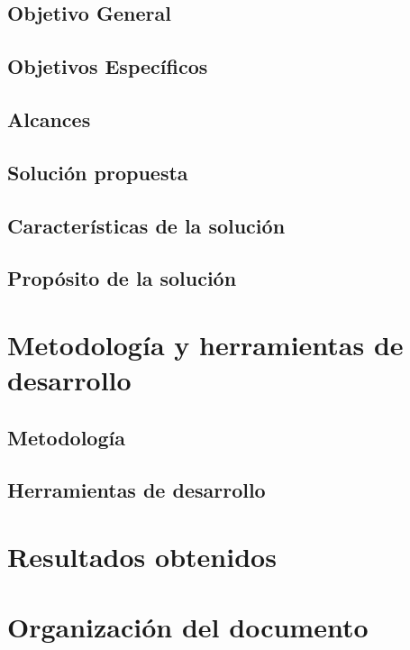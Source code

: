 




\subsection{Objetivo General}
\label{intro:objetivogeneral}


\subsection{Objetivos Espec\'ificos}
\label{intro:objetivosespecificos}





\subsection{Alcances}
\label{intro:alcances}


\subsection{Soluci\'on propuesta}
\label{intro:solucionpropuesta}

\subsection{Caracter\'isticas de la solución}
\label{intro:caracteristicassolucion}



\subsection{Prop\'osito de la solución}
\label{intro:propositosolucion}


\section{Metodolog\'ia y herramientas de desarrollo}
\subsection{Metodolog\'ia}



\subsection{Herramientas de desarrollo}


\section{Resultados obtenidos}


\section{Organizaci\'on del documento}

